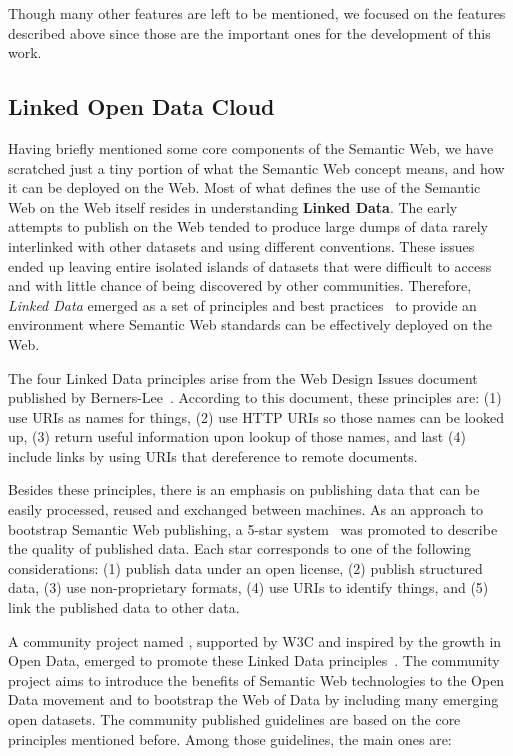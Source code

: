 Though many other \SPARQL{} features are left to be mentioned, we focused on the features described 
above since those are the important ones for the development of this work.

\subsection{Linked Open Data Cloud}
\label{cap2:semWeb/linkedData}
Having briefly mentioned some core components of the Semantic Web, we have scratched just a tiny 
portion of what the Semantic Web concept means, and how it can be deployed on the Web. Most of 
what defines the use of the Semantic Web on the Web itself resides in understanding 
\textbf{Linked Data}. The early attempts to publish \RDF{} on the Web tended to produce large dumps 
of data rarely interlinked with other \RDF{} datasets and using different conventions. These issues 
ended up leaving entire isolated islands of \RDF{} datasets that were difficult to access and with 
little chance of being discovered by other communities. Therefore, \textit{Linked Data} emerged as 
a set of principles and best practices~\cite{key:ldprinciples} to provide an environment where 
Semantic Web standards can be effectively deployed on the Web.

The four Linked Data principles arise from the Web Design Issues document published by 
Berners-Lee~\cite{key:ldprinciples}. According to this document, these principles are: (1) use URIs 
as names for things, (2) use HTTP URIs so those names can be looked up, (3) return useful 
information upon lookup of those names, and last (4) include links by using URIs that dereference 
to remote documents. 

Besides these principles, there is an emphasis on publishing data that can be easily processed, 
reused and exchanged between machines. As an approach to bootstrap Semantic Web publishing, 
a 5-star system~\cite{key:ldprinciples} was promoted to describe the quality of published \RDF{} data. 
Each star corresponds to one of the following considerations: (1) publish data under an open license, 
(2) publish structured data, (3) use non-proprietary formats, (4) use URIs to identify things, and 
(5) link the published data to other data.

A community project named , supported by W3C and inspired by the growth 
in Open Data, emerged to promote these Linked Data principles~\cite{key:ldbook}. The community 
project aims to introduce the benefits of Semantic Web technologies to the Open Data movement and 
to bootstrap the Web of Data by including many emerging open datasets. The community published 
guidelines are based on the core principles mentioned before. Among those guidelines, the main 
ones are:


